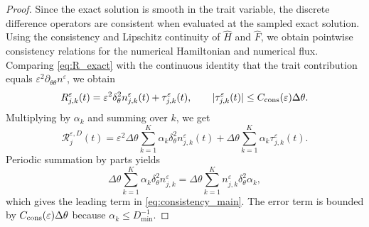 \documentclass[11pt,a4paper]{ctexart}
\begin{document}
\begin{proof}
Since the exact solution is smooth in the trait variable, the discrete difference operators are consistent when evaluated at the sampled exact solution. Using the consistency and Lipschitz continuity of \(\widehat H\) and \(\widehat F\), we obtain pointwise consistency relations for the numerical Hamiltonian and numerical flux. Comparing \eqref{eq:R_exact} with the continuous identity that the trait contribution equals \(\varepsilon^2\partial_{\theta\theta}n^\varepsilon\), we obtain
\[
R_{j,k}^\varepsilon(t)
=
\varepsilon^2\delta_\theta^2 n_{j,k}^\varepsilon(t)
+\tau_{j,k}^\varepsilon(t),
\qquad
|\tau_{j,k}^\varepsilon(t)|\le C_{\rm cons}(\varepsilon)\Delta\theta.
\]
Multiplying by \(\alpha_k\) and summing over \(k\), we get
\[
\mathcal R_j^{\varepsilon,D}(t)
=
\varepsilon^2\Delta\theta\sum_{k=1}^K \alpha_k\delta_\theta^2 n_{j,k}^\varepsilon(t)
+\Delta\theta\sum_{k=1}^K \alpha_k\tau_{j,k}^\varepsilon(t).
\]
Periodic summation by parts yields
\[
\Delta\theta\sum_{k=1}^K \alpha_k\delta_\theta^2 n_{j,k}^\varepsilon
=
\Delta\theta\sum_{k=1}^K n_{j,k}^\varepsilon\delta_\theta^2\alpha_k,
\]
which gives the leading term in \eqref{eq:consistency_main}. The error term is bounded by \(C_{\rm cons}(\varepsilon)\Delta\theta\) because \(\alpha_k\le D_{\min}^{-1}\).
\end{proof}
\end{document}
